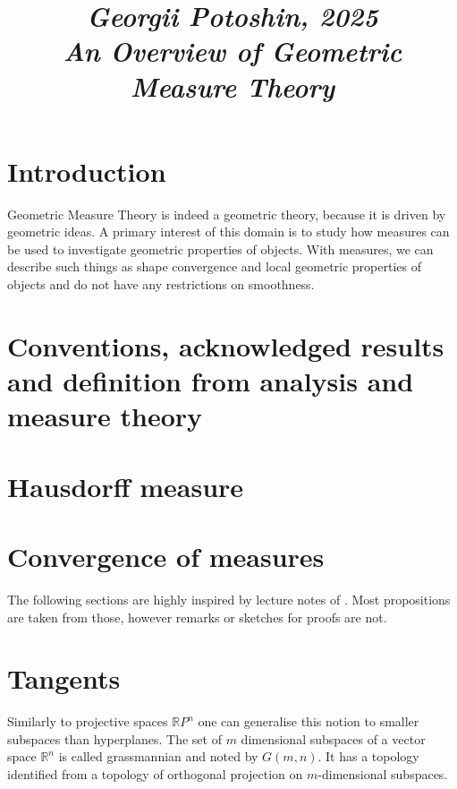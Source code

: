\documentclass{article}
\begin{document}
\title{
\vspace{-1cm}
\textit{\small{Georgii Potoshin, 2025}}\\
\vspace{0.3ex}
\textit{\huge{An Overview of Geometric Measure Theory}}\vspace{1ex}
}
\date{\vspace{-5ex}}
\maketitle

\section{Introduction}
Geometric Measure Theory is indeed a geometric theory, because it is
driven by geometric ideas. A primary interest of this domain is to study how
measures can be used to investigate geometric properties of objects. With measures,
we can describe such things as shape convergence and local geometric properties
of objects and do not have any restrictions on smoothness.

\section{Conventions, acknowledged results and definition from analysis and measure theory}


\section{Hausdorff measure}


\section{Convergence of measures}


The following sections are highly inspired by lecture notes of \cite{giovanni_alberti}.
Most propositions are taken from those, however remarks or sketches for proofs
are not.

\section{Tangents}

Similarly to projective spaces $\mathbb{R}P^n$ one can generalise this notion to
smaller subspaces than hyperplanes. The set of $m$ dimensional subspaces of a
vector space $\mathbb{R}^n$ is called grassmannian and noted by $G(m,n)$. It
has a topology identified from a topology of orthogonal projection on
$m$-dimensional subspaces.
\end{document}
